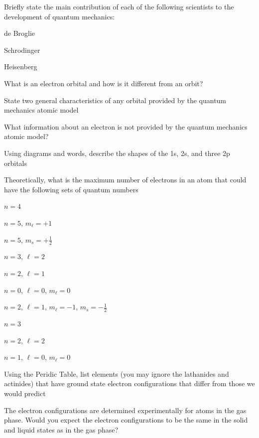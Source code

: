 \begin{problems}
    \item Briefly state the main contribution of each of the following scientists to the 
        development of quantum mechanics:
        \begin{enum-alph}
            \item de Broglie
            \item Schrodinger
            \item Heisenberg
        \end{enum-alph}
    \item What is an electron orbital and how is it different from an orbit?
    \item State two general characteristics of any orbital provided by the quantum mechanics atomic
        model
    \item What information about an electron is not provided by the quantum mechanics atomic
        model?
    \item Using diagrams and words, describe the shapes of the 1s, 2s, and three 2p orbitals
    \item Theoretically, what is the maximum number of electrons in an atom that could have the
        following sets of quantum numbers
        \begin{enum-alph}
            \item $n=4$
            \item $n=5$, $m_\ell=+1$
            \item $n=5$, $m_s=+\frac{1}{2}$
            \item $n=3$, $\ell=2$
            \item $n=2$, $\ell=1$
            \item $n=0$, $\ell=0$, $m_\ell=0$
            \item $n=2$, $\ell=1$, $m_\ell=-1$, $m_s=-\frac{1}{2}$
            \item $n=3$
            \item $n=2$, $\ell=2$
            \item $n=1$, $\ell=0$, $m_\ell=0$
        \end{enum-alph}
    \item Using the Peridic Table, list elements (you may ignore the lathanides and actinides)
        that have ground state electron configurations that differ from those we would predict
    \item The electron configurations are determined experimentally for atoms in the gas phase.
        Would you expect the electron configurations to be the same in the solid and liquid
        states as in the gas phase?
\end{problems}

